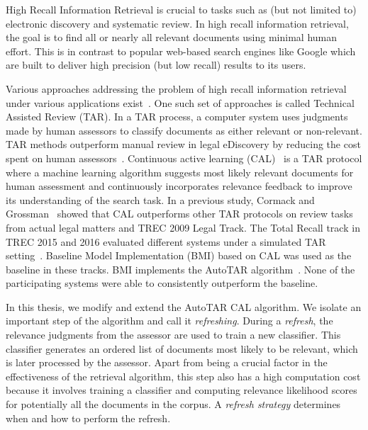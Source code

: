 High Recall Information Retrieval is crucial to tasks such as (but not limited
to) electronic discovery and systematic review. In high recall information
retrieval, the goal is to find all or nearly all relevant documents using
minimal human effort. This is in contrast to popular web-based search engines
like Google which are built to deliver high precision (but low recall) results
to its users.

Various approaches addressing the problem of high recall information retrieval
under various applications
exist~\cite{li2014req,hogan2010automation,cormack2014evaluation}. One such set
of approaches is called Technical Assisted Review (TAR).  In a TAR process, a
computer system uses judgments made by human assessors to classify documents as
either relevant or non-relevant. TAR methods outperform manual review in legal
eDiscovery by reducing the cost spent on human
assessors~\cite{grossman2010technology,roitblat2010document}.   Continuous
active learning (CAL)~\cite{cormack2014evaluation,cormack2015autonomy} is a TAR
protocol where a machine learning algorithm suggests most likely relevant
documents for human assessment and continuously incorporates relevance feedback to improve
its understanding of the search task.  In a previous study, Cormack and
Grossman~\cite{cormack2014evaluation} showed that CAL outperforms other TAR
protocols on review tasks from actual legal matters and TREC 2009 Legal Track.
The Total Recall track in TREC 2015 and 2016 evaluated different systems under a
simulated TAR setting~\cite{grossman2016trec,roegiest2015trec}.  Baseline Model
Implementation (BMI) based on CAL was used as the baseline in these tracks. BMI
implements the AutoTAR algorithm~\cite{cormack2015autonomy}.  None of the
participating systems were able to consistently outperform the baseline.

In this thesis, we modify and extend the AutoTAR CAL algorithm. We isolate an
important step of the algorithm and call it \textit{refreshing}.  During a
\textit{refresh}, the relevance judgments from the assessor are used to train a
new classifier. This classifier generates an ordered list of documents most
likely to be relevant, which is later processed by the assessor. Apart from
being a crucial factor in the effectiveness of the retrieval algorithm, this
step also has a high computation cost because it involves training a classifier
and computing relevance likelihood scores for potentially all the documents in
the corpus. A \textit{refresh strategy} determines when and how to perform the
refresh.

